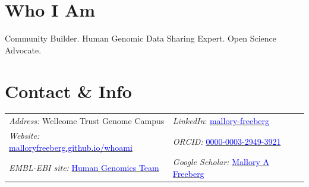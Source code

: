 \documentclass[margin,line]{res}
\begin{document}
\begin{resume}

\section{\sc Who I Am}
Community Builder. Human Genomic Data Sharing Expert. Open Science Advocate.

\section{\sc Contact \& Info}
\begin{tabular}{@{}p{3in}p{3in}} %
{\it Address:} Wellcome Trust Genome Campus & {\em LinkedIn}: \href{https://www.linkedin.com/in/mallory-freeberg/}{\textcolor{blue}{mallory-freeberg}} \\
{\em Website:} \href{https://malloryfreeberg.github.io/whoami/}{\textcolor{blue}{malloryfreeberg.github.io/whoami}} & {\em ORCID:} \href{https://orcid.org/0000-0003-2949-3921}{\textcolor{blue}{0000-0003-2949-3921}} \\
{\em EMBL-EBI site:} \href{https://www.ebi.ac.uk/about/teams/human-genomics/}{\textcolor{blue}{Human Genomics Team}} & {\em Google Scholar:} \href{https://scholar.google.com/citations?user=2LCcJA0AAAAJ&hl=en}{\textcolor{blue}{Mallory A Freeberg}} \\
\end{tabular}


\end{resume}
\end{document}
